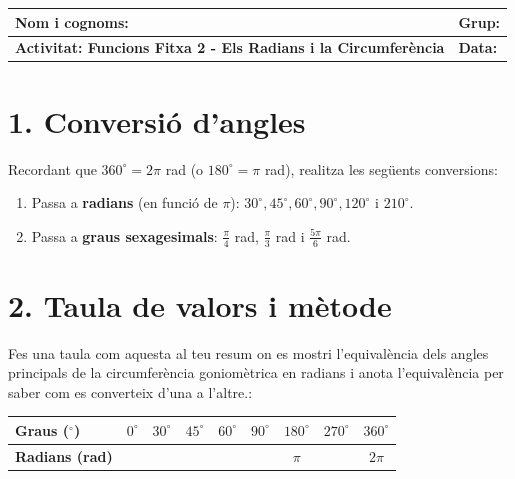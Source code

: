 \documentclass[12pt,a4paper]{article}
\begin{document}
\begingroup
\renewcommand{\arraystretch}{2.2}
\begin{tabularx}{\textwidth}{|X|p{4cm}|}
    \hline
    \textbf{Nom i cognoms:} & \textbf{Grup:} \\ \hline
    \textbf{Activitat: Funcions Fitxa 2 - Els Radians i la Circumferència} & \textbf{Data:} \\ \hline
\end{tabularx}
\endgroup

\section*{1. Conversió d'angles}
Recordant que $360^\circ = 2\pi$ rad (o $180^\circ = \pi$ rad), realitza les següents conversions:

\begin{enumerate}[label=\alph*)]
    \item Passa a \textbf{radians} (en funció de $\pi$): $30^\circ, 45^\circ, 60^\circ, 90^\circ, 120^\circ$ i $210^\circ$.
    \item Passa a \textbf{graus sexagesimals}: $\frac{\pi}{4}$ rad, $\frac{\pi}{3}$ rad i $\frac{5\pi}{6}$ rad.
\end{enumerate}

\section*{2. Taula de valors i mètode}
Fes una taula com aquesta al teu resum on es mostri l'equivalència dels angles principals de la circumferència goniomètrica en radians i anota l'equivalència per saber com es converteix d'una a l'altre.:

\begin{center}
\renewcommand{\arraystretch}{1.5}
\begin{tabular}{|l|c|c|c|c|c|c|c|c|}
\hline
\textbf{Graus ($^\circ$)} & $0^\circ$ & $30^\circ$ & $45^\circ$ & $60^\circ$ & $90^\circ$ & $180^\circ$ & $270^\circ$ & $360^\circ$ \\ \hline
\textbf{Radians (rad)} & & & & & & $\pi$ & & $2\pi$ \\ \hline
\end{tabular}
\end{center}
\end{document}
